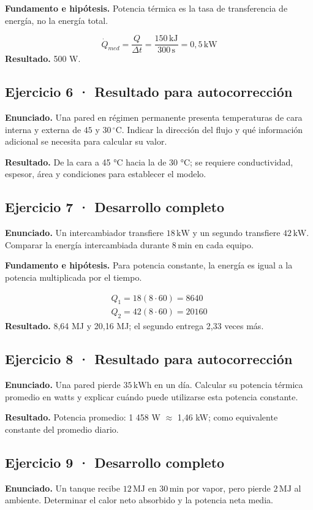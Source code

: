 \documentclass[11pt,a4paper]{article}
\begin{document}
\textbf{Fundamento e hipótesis.} Potencia térmica es la tasa de transferencia de energía, no la energía total.

\[
\dot Q_{med}=\frac{Q}{\Delta t}=\frac{150\,\mathrm{kJ}}{300\,\mathrm s}=0{,}5\,\mathrm{kW}
\]
\textbf{Resultado.} 500 W.


\subsection*{Ejercicio 6 · Resultado para autocorrección}
\textbf{Enunciado.} Una pared en régimen permanente presenta temperaturas de cara interna y externa de \(45\) y \(30\,^\circ\mathrm C\). Indicar la dirección del flujo y qué información adicional se necesita para calcular su valor.

\textbf{Resultado.} De la cara a 45 °C hacia la de 30 °C; se requiere conductividad, espesor, área y condiciones para establecer el modelo.


\subsection*{Ejercicio 7 · Desarrollo completo}
\textbf{Enunciado.} Un intercambiador transfiere \(18\,\mathrm{kW}\) y un segundo transfiere \(42\,\mathrm{kW}\). Comparar la energía intercambiada durante \(8\,\mathrm{min}\) en cada equipo.

\textbf{Fundamento e hipótesis.} Para potencia constante, la energía es igual a la potencia multiplicada por el tiempo.

\[
\begin{gathered}
Q_1=18(8\cdot60)=8640\\Q_2=42(8\cdot60)=20160
\end{gathered}
\]
\textbf{Resultado.} 8,64 MJ y 20,16 MJ; el segundo entrega 2,33 veces más.


\subsection*{Ejercicio 8 · Resultado para autocorrección}
\textbf{Enunciado.} Una pared pierde \(35\,\mathrm{kWh}\) en un día. Calcular su potencia térmica promedio en watts y explicar cuándo puede utilizarse esta potencia constante.

\textbf{Resultado.} Potencia promedio: 1 458 W \ensuremath{\approx} 1,46 kW; como equivalente constante del promedio diario.


\subsection*{Ejercicio 9 · Desarrollo completo}
\textbf{Enunciado.} Un tanque recibe \(12\,\mathrm{MJ}\) en \(30\,\mathrm{min}\) por vapor, pero pierde \(2\,\mathrm{MJ}\) al ambiente. Determinar el calor neto absorbido y la potencia neta media.
\end{document}
